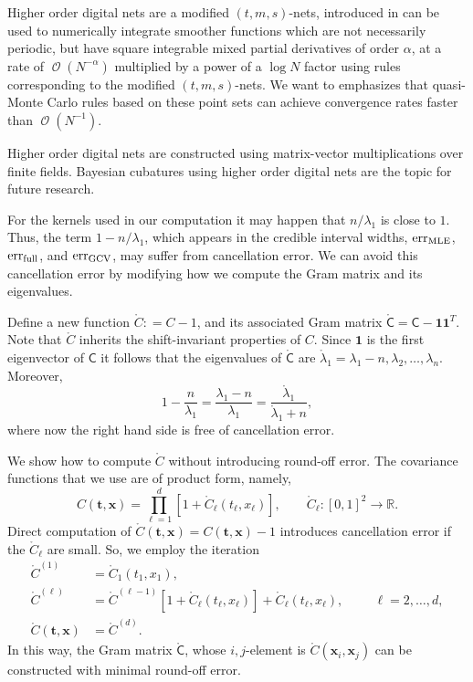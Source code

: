 \documentclass{iitthesis}          %
\DeclareMathOperator{\Order}{{\mathcal O}}
\newcommand{\bm}[1]{\boldsymbol{#1}}
\newcommand{\reals}{\mathbb{R}}
\newcommand{\rC}{\mathring{C}}
\newcommand{\rlambda}{\mathring{\lambda}}
\newcommand{\vt}{\bm{t}}
\newcommand{\vx}{\bm{x}}
\newcommand{\vone}{\bm{1}}
\newcommand{\mC}{\mathsf{C}}
\newcommand{\rmC}{\mathring{\mathsf{C}}}
\newcommand{\MLE}{\textup{MLE}}
\newcommand{\err}{\textup{err}}
\begin{document}
Higher order digital nets are a modified $(t,m,s)$-nets, introduced in \cite{Dic08a} can be used to numerically integrate smoother functions which are not necessarily periodic, but have square integrable mixed partial derivatives of order $\alpha$, at a rate of $\Order(N^{-\alpha})$ multiplied by a power of a $\log N$ factor using rules corresponding to the modified $(t,m, s)$-nets.
We want to emphasizes that quasi-Monte Carlo rules based on these point sets can achieve convergence rates faster than $\Order(N^{-1})$.

Higher order digital nets are constructed using matrix-vector multiplications over finite
fields. Bayesian cubatures using higher order digital nets are the topic for future research.


\clearpage







\label{sec:NumExp}

\label{sec:overcome_cancel_error}

For the kernels used in our computation it may happen that $n/\lambda_1$ is close to $1$.  Thus, the term $1-n/\lambda_1$, which appears in the credible interval widths, $\err_{\MLE}$, $\err_{\textup{full}}$, and $\err_{\textup{GCV}}$, may suffer from cancellation error.  We can avoid this cancellation error by modifying how we compute the Gram matrix and its eigenvalues.

Define a new function $\rC : = C -1$, and its associated Gram matrix $\rmC = \mC - \vone \vone^T$.   Note that $\rC$ inherits the shift-invariant properties of $C$.  Since $\vone$ is the first eigenvector of $\mC$ it follows that the eigenvalues of $\rmC$ are $\rlambda_1 = \lambda_1 - n, \lambda_2, \ldots, \lambda_n$.  Moreover,
\begin{equation*}
1 - \frac{n}{\lambda_1}  = \frac{\lambda_1 - n}{\lambda_1} = \frac{\rlambda_1}{\rlambda_1 +n},
\end{equation*}
where now the right hand side is free of cancellation error.

We show how to compute $\rC$ without introducing round-off error.  The covariance functions that we use are of product form, namely,
\begin{equation*}
C(\vt, \vx) = \prod_{\ell=1}^d \left[1 + \rC_\ell(t_\ell,x_\ell) \right], \qquad  \rC_\ell:[0,1]^2 \to \reals.
\end{equation*}
Direct computation of $\rC (\vt,\vx) = C(\vt,\vx) -1$ introduces cancellation error if the $ \rC_\ell$ are small.  So, we employ the iteration
\begin{align*}
\rC^{(1)} &= \rC_1(t_1,x_1),  \\
\rC^{(\ell)} &  = \rC^{(\ell-1)}[1 + \rC_\ell(t_\ell,x_\ell)] + \rC_\ell(t_\ell,x_\ell),  \hspace{1cm} \ell = 2, \ldots, d, \\
\rC(\vt,\vx)  & = \rC^{(d)}.
\end{align*}
In this way, the Gram matrix $\rmC$, whose $i,j$-element is $\rC(\vx_i,\vx_j)$ can be constructed with minimal round-off error.
\end{document}
